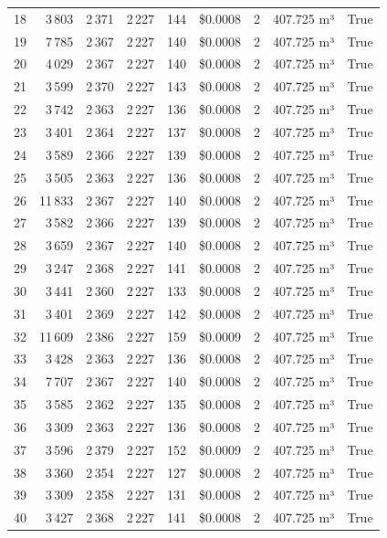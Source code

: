 \documentclass[a4paper,11pt]{article}
\begin{document}
\begin{table}[ht]
\begin{tabular}{r r r r r r r p{3cm} l}
18 & 3\,803 & 2\,371 & 2\,227 & 144 & \$0.0008 & 2 & 407.725 m³ & True \\
19 & 7\,785 & 2\,367 & 2\,227 & 140 & \$0.0008 & 2 & 407.725 m³ & True \\
20 & 4\,029 & 2\,367 & 2\,227 & 140 & \$0.0008 & 2 & 407.725 m³ & True \\
21 & 3\,599 & 2\,370 & 2\,227 & 143 & \$0.0008 & 2 & 407.725 m³ & True \\
22 & 3\,742 & 2\,363 & 2\,227 & 136 & \$0.0008 & 2 & 407.725 m³ & True \\
23 & 3\,401 & 2\,364 & 2\,227 & 137 & \$0.0008 & 2 & 407.725 m³ & True \\
24 & 3\,589 & 2\,366 & 2\,227 & 139 & \$0.0008 & 2 & 407.725 m³ & True \\
25 & 3\,505 & 2\,363 & 2\,227 & 136 & \$0.0008 & 2 & 407.725 m³ & True \\
26 & 11\,833 & 2\,367 & 2\,227 & 140 & \$0.0008 & 2 & 407.725 m³ & True \\
27 & 3\,582 & 2\,366 & 2\,227 & 139 & \$0.0008 & 2 & 407.725 m³ & True \\
28 & 3\,659 & 2\,367 & 2\,227 & 140 & \$0.0008 & 2 & 407.725 m³ & True \\
29 & 3\,247 & 2\,368 & 2\,227 & 141 & \$0.0008 & 2 & 407.725 m³ & True \\
30 & 3\,441 & 2\,360 & 2\,227 & 133 & \$0.0008 & 2 & 407.725 m³ & True \\
31 & 3\,401 & 2\,369 & 2\,227 & 142 & \$0.0008 & 2 & 407.725 m³ & True \\
32 & 11\,609 & 2\,386 & 2\,227 & 159 & \$0.0009 & 2 & 407.725 m³ & True \\
33 & 3\,428 & 2\,363 & 2\,227 & 136 & \$0.0008 & 2 & 407.725 m³ & True \\
34 & 7\,707 & 2\,367 & 2\,227 & 140 & \$0.0008 & 2 & 407.725 m³ & True \\
35 & 3\,585 & 2\,362 & 2\,227 & 135 & \$0.0008 & 2 & 407.725 m³ & True \\
36 & 3\,309 & 2\,363 & 2\,227 & 136 & \$0.0008 & 2 & 407.725 m³ & True \\
37 & 3\,596 & 2\,379 & 2\,227 & 152 & \$0.0009 & 2 & 407.725 m³ & True \\
38 & 3\,360 & 2\,354 & 2\,227 & 127 & \$0.0008 & 2 & 407.725 m³ & True \\
39 & 3\,309 & 2\,358 & 2\,227 & 131 & \$0.0008 & 2 & 407.725 m³ & True \\
40 & 3\,427 & 2\,368 & 2\,227 & 141 & \$0.0008 & 2 & 407.725 m³ & True \\

\end{tabular}
\end{table}
\end{document}
